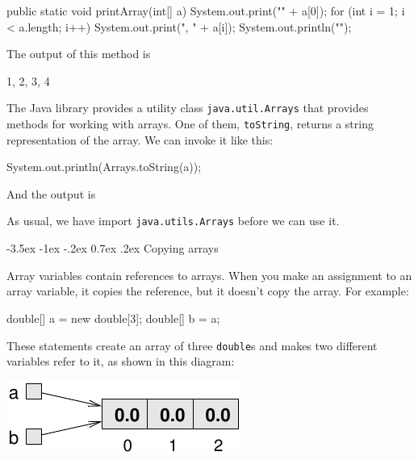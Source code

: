 \documentclass[12pt]{book}
\makeatletter
\theoremstyle{exercise}
\newcommand{\java}[1]{\verb"#1"}
\renewcommand{\section}{\@startsection{section}{1}{\z@}%
    {-3.5ex \@plus -1ex \@minus -.2ex}%
    {0.7ex \@plus.2ex}%
    {\normalfont\Large\bfseries}}
\newcommand{\java}[1]{\lstinline{#1}} %
\makeatother
\begin{document}
\begin{code}
    public static void printArray(int[] a) {
        System.out.print("{" + a[0]);
        for (int i = 1; i < a.length; i++) {
            System.out.print(", " + a[i]);
        }
        System.out.println("}");
    }
\end{code}

The output of this method is

\begin{stdout}
{1, 2, 3, 4}
\end{stdout}


The Java library provides a utility class \java{java.util.Arrays} that provides methods for working with arrays.
One of them, \java{toString}, returns a string representation of the array.
We can invoke it like this:

\begin{code}
    System.out.println(Arrays.toString(a));
\end{code}

And the output is

\begin{stdout}
[1, 2, 3, 4]
\end{stdout}

As usual, we have import \java{java.utils.Arrays} before we can use it.


\section{Copying arrays}
\label{copyarray}

Array variables contain references to arrays.
When you make an assignment to an array variable, it copies the reference, but it doesn't copy the array.
For example:

\begin{code}
    double[] a = new double[3];
    double[] b = a;
\end{code}

These statements create an array of three \java{double}s and makes two different variables refer to it, as shown in this diagram:

\begin{center}
\includegraphics{figs/array3.pdf}
\end{center}
\end{document}
